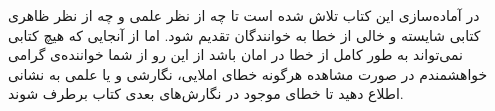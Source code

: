 در آماده‌سازی این کتاب تلاش شده است تا چه از نظر علمی و چه از نظر ظاهری کتابی شایسته و خالی از خطا به خوانندگان تقدیم شود. اما از آنجایی که هیچ کتابی نمی‌تواند به طور کامل از خطا در امان باشد از این رو از شما خواننده‌ی گرامی خواهشمندم در صورت مشاهده هرگونه خطای املایی، نگارشی و یا علمی به نشانی
{} اطلاع دهید تا خطای موجود در نگارش‌های بعدی کتاب برطرف شوند.

\begin{flushleft}
\small
\author\\
\date
\end{flushleft}
\newpage